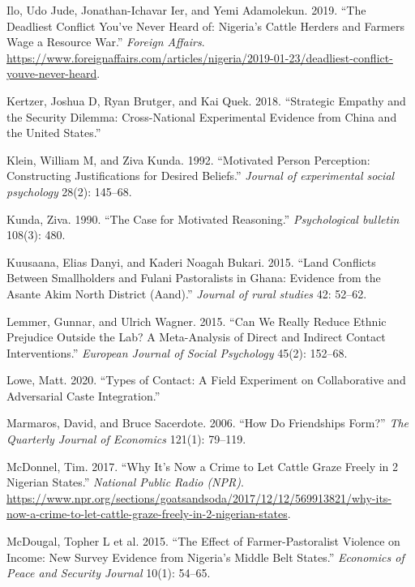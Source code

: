 \documentclass[11pt]{article}
\begin{document}
\begin{cslreferences}
\leavevmode\hypertarget{ref-fa2019deadly}{}%
Ilo, Udo Jude, Jonathan-Ichavar Ier, and Yemi Adamolekun. 2019. ``The
Deadliest Conflict You've Never Heard of: Nigeria's Cattle Herders and
Farmers Wage a Resource War.'' \emph{Foreign Affairs}.
\url{https://www.foreignaffairs.com/articles/nigeria/2019-01-23/deadliest-conflict-youve-never-heard}.

\leavevmode\hypertarget{ref-kertzer2018empathy}{}%
Kertzer, Joshua D, Ryan Brutger, and Kai Quek. 2018. ``Strategic Empathy
and the Security Dilemma: Cross-National Experimental Evidence from
China and the United States.''

\leavevmode\hypertarget{ref-klein1992motivated}{}%
Klein, William M, and Ziva Kunda. 1992. ``Motivated Person Perception:
Constructing Justifications for Desired Beliefs.'' \emph{Journal of
experimental social psychology} 28(2): 145--68.

\leavevmode\hypertarget{ref-kunda1990motivatedReasoning}{}%
Kunda, Ziva. 1990. ``The Case for Motivated Reasoning.''
\emph{Psychological bulletin} 108(3): 480.

\leavevmode\hypertarget{ref-kuusaana2015land}{}%
Kuusaana, Elias Danyi, and Kaderi Noagah Bukari. 2015. ``Land Conflicts
Between Smallholders and Fulani Pastoralists in Ghana: Evidence from the
Asante Akim North District (Aand).'' \emph{Journal of rural studies} 42:
52--62.

\leavevmode\hypertarget{ref-lemmer2015can}{}%
Lemmer, Gunnar, and Ulrich Wagner. 2015. ``Can We Really Reduce Ethnic
Prejudice Outside the Lab? A Meta-Analysis of Direct and Indirect
Contact Interventions.'' \emph{European Journal of Social Psychology}
45(2): 152--68.

\leavevmode\hypertarget{ref-lowe2020types}{}%
Lowe, Matt. 2020. ``Types of Contact: A Field Experiment on
Collaborative and Adversarial Caste Integration.''

\leavevmode\hypertarget{ref-marmaros2006friendships}{}%
Marmaros, David, and Bruce Sacerdote. 2006. ``How Do Friendships Form?''
\emph{The Quarterly Journal of Economics} 121(1): 79--119.

\leavevmode\hypertarget{ref-mcdonnel2017graze}{}%
McDonnel, Tim. 2017. ``Why It's Now a Crime to Let Cattle Graze Freely
in 2 Nigerian States.'' \emph{National Public Radio (NPR)}.
\url{https://www.npr.org/sections/goatsandsoda/2017/12/12/569913821/why-its-now-a-crime-to-let-cattle-graze-freely-in-2-nigerian-states}.

\leavevmode\hypertarget{ref-mcdougal2015effect}{}%
McDougal, Topher L et al. 2015. ``The Effect of Farmer-Pastoralist
Violence on Income: New Survey Evidence from Nigeria's Middle Belt
States.'' \emph{Economics of Peace and Security Journal} 10(1): 54--65.


\end{cslreferences}
\end{document}
